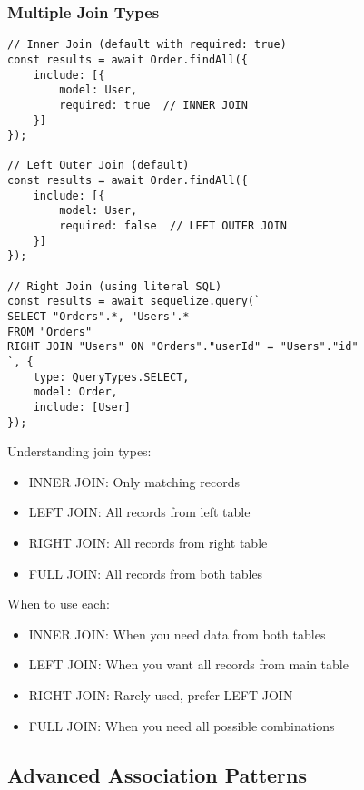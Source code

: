 \documentclass[12pt,a4paper]{book}
\begin{document}
	\subsubsection{Multiple Join Types}
	\begin{tcolorbox}[title=Different Join Types]
		\begin{verbatim}
// Inner Join (default with required: true)
const results = await Order.findAll({
	include: [{
		model: User,
		required: true  // INNER JOIN
	}]
});

// Left Outer Join (default)
const results = await Order.findAll({
	include: [{
		model: User,
		required: false  // LEFT OUTER JOIN
	}]
});

// Right Join (using literal SQL)
const results = await sequelize.query(`
SELECT "Orders".*, "Users".*
FROM "Orders"
RIGHT JOIN "Users" ON "Orders"."userId" = "Users"."id"
`, {
	type: QueryTypes.SELECT,
	model: Order,
	include: [User]
});
		\end{verbatim}
		
		Understanding join types:
		\begin{itemize}
			\item INNER JOIN: Only matching records
			\item LEFT JOIN: All records from left table
			\item RIGHT JOIN: All records from right table
			\item FULL JOIN: All records from both tables
		\end{itemize}
		
		When to use each:
		\begin{itemize}
			\item INNER JOIN: When you need data from both tables
			\item LEFT JOIN: When you want all records from main table
			\item RIGHT JOIN: Rarely used, prefer LEFT JOIN
			\item FULL JOIN: When you need all possible combinations
		\end{itemize}
	\end{tcolorbox}
	
	\subsection{Advanced Association Patterns}
	
\end{document}
